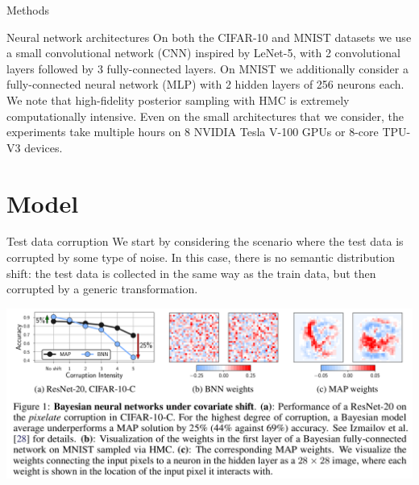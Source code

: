 \documentclass{beamer}
\begin{document}
\begin{frame}{Methods}
\begin{block}{Neural network architectures}
    On both the CIFAR-10 and MNIST datasets we use a small
    convolutional network (CNN) inspired by LeNet-5, with 2 convolutional layers followed by
    3 fully-connected layers. On MNIST we additionally consider a fully-connected neural network
    (MLP) with 2 hidden layers of 256 neurons each. We note that high-fidelity posterior sampling with
    HMC is extremely computationally intensive. Even on the small architectures that we consider, the
    experiments take multiple hours on 8 NVIDIA Tesla V-100 GPUs or 8-core TPU-V3 devices.
    \end{block}
\end{frame}

 

\section{Model}
\begin{frame}{}
\begin{block}{Test data corruption}
    We start by considering the scenario where the test data is corrupted by some type of noise. In this
    case, there is no semantic distribution shift: the test data is collected in the same way as the train data,
    but then corrupted by a generic transformation.
\end{block}
    \includegraphics[scale=0.22]{figure1.png}
\end{frame}
\end{document}
